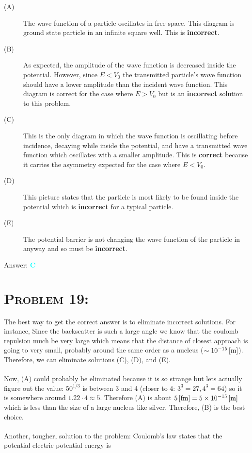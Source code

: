 \documentclass{article}
\providecommand{\e}[1]{\ensuremath{\times 10^{#1}}}
\begin{document}
\begin{description} 

\item[(A)] The wave function of a particle oscillates in free space. This diagram is ground state particle in an infinite square well. This is \textbf{incorrect}.

\item[(B)] As expected, the amplitude of the wave function is decreased inside the potential. However, since $E < V_{0}$ the transmitted particle's wave function should have a lower amplitude than the incident wave function. This diagram is correct for the case where $E > V_{0}$ but is an \textbf{incorrect} solution to this problem.

\item[(C)] This is the only diagram in which the wave function is oscillating before incidence, decaying while inside the potential, and have a transmitted wave function which oscillates with a smaller amplitude. This is \textbf{correct} because it carries the asymmetry expected for the case where $E < V_{0}$.

\item[(D)] This picture states that the particle is most likely to be found inside the potential which is  \textbf{incorrect} for a typical particle.

\item[(E)] The potential barrier is not changing the wave function of the particle in anyway and so must be \textbf{incorrect}.
\\
\end{description}

Answer: \textbf{\textcolor{cyan}C}\\


\section{\textsc{Problem 19:}} The best way to get the correct answer is to eliminate incorrect solutions. For instance, Since the backscatter is such a large angle we know that the coulomb repulsion much be very large which means that the distance of closest approach is going to very small, probably around the same order as a nucleus ($\sim \unit[10^{-15}]{[m]}$). Therefore, we can eliminate solutions (C), (D), and (E). \\\\Now, (A) could probably be eliminated because it is so strange but lets actually figure out the value: $50^{1/3}$ is between 3 and 4 (closer to 4: $3^{3} = 27, 4^{3} = 64$) so it is somewhere around $1.22 \cdot 4 \approx 5$. Therefore (A) is about $\unit[5]{[fm]} = \unit[5\e{-15}]{[m]}$ which is less than the size of a large nucleus like silver. Therefore, (B) is the best choice.\\
\\
Another, tougher, solution to the problem: Coulomb's law states that the potential electric potential energy is 
\end{document}
